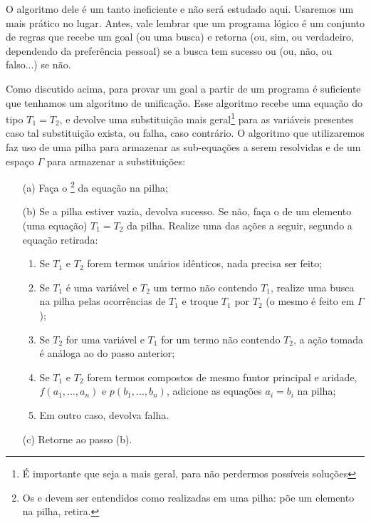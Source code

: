 \documentclass{article}
\begin{document}
O algoritmo dele é um tanto ineficiente e não será estudado aqui. Usaremos um mais prático no lugar. Antes, vale lembrar que um programa lógico é um conjunto de regras que recebe um goal (ou uma busca) e retorna  (ou, sim, ou verdadeiro, dependendo da preferência pessoal) se a busca tem sucesso ou  (ou, não, ou falso...) se não.

Como discutido acima, para provar um goal a partir de um programa é suficiente que tenhamos um algoritmo de unificação. Esse algoritmo recebe uma equação do tipo $T_1 = T_2$, e devolve uma substituição mais geral\footnote{É importante que seja a mais geral, para não perdermos possíveis soluções}
para as variáveis presentes caso tal substituição exista, ou falha, caso contrário. O algoritmo que utilizaremos faz uso de uma pilha para armazenar as sub-equações a serem resolvidas e de um espaço
$\Gamma$ para armazenar a substituições:

\begin{itemize}
    \item[(a)] Faça o \footnote{Os  e  devem ser entendidos como realizadas em uma pilha:  põe um elemento na pilha,  retira.} da equação na pilha;
    \item[(b)] Se a pilha estiver vazia, devolva sucesso. Se não, faça o  de um elemento (uma equação) $T_1 = T_2$ da pilha. Realize uma das ações a seguir, segundo a equação retirada:
      \begin{enumerate}
        \item Se $T_1$ e $T_2$ forem termos unários idênticos, nada precisa ser feito;
        \item Se $T_1$ é uma variável e $T_2$ um termo não contendo $T_1$, realize uma busca na pilha pelas ocorrências de $T_1$ e troque $T_1$ por $T_2$ (o mesmo é feito em $\Gamma$);
        \item Se $T_2$ for uma variável e $T_1$ for um termo não contendo $T_2$, a ação tomada é análoga ao do passo anterior;
        \item Se $T_1$ e $T_2$ forem termos compostos de mesmo funtor principal e aridade, $f(a_1, ..., a_n)$ e $p(b_1, ..., b_n)$, adicione as equações $a_i = b_i$ na pilha;
        \item Em outro caso, devolva falha.
      \end{enumerate}
    \item[(c)] Retorne ao passo (b).
\end{itemize}
\end{document}
